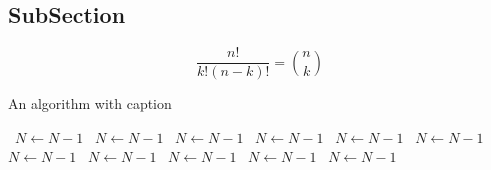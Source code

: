 \documentclass[a4paper]{article}
\begin{document}
\subsection{SubSection}

\[ \frac{n!}{k!(n-k)!} = \binom{n}{k} \]

\begin{algorithm}
\caption{An algorithm with caption}
\begin{algorithmic}
\    \State $N \gets N - 1$
\    \State $N \gets N - 1$
\    \State $N \gets N - 1$
\    \State $N \gets N - 1$
\    \State $N \gets N - 1$
\    \State $N \gets N - 1$
\    \State $N \gets N - 1$
\    \State $N \gets N - 1$
\    \State $N \gets N - 1$
\    \State $N \gets N - 1$
\    \State $N \gets N - 1$
\EndWhile
\end{algorithmic}
\end{algorithm}
\end{document}
